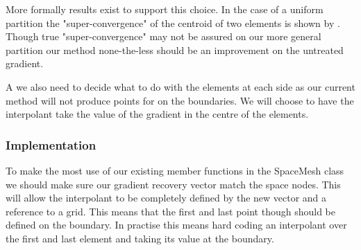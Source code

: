 \documentclass{uonmathreport}
\theoremstyle{definition}
\theoremstyle{problem}
\theoremstyle{theorem}
\begin{document}
More formally results exist to support this choice. In the case of a uniform partition the "super-convergence" of the centroid of two elements is shown by \cite{zlamal1978superconvergence}. Though true "super-convergence" may not be assured on our more general partition our method none-the-less should be an improvement on the untreated gradient. 

A we also need to decide what to do with the elements at each side as our current method will not produce points for on the boundaries. We will choose to have the interpolant take the value of the gradient in the centre of the elements.



\begin{center}
\end{center}

\subsubsection{Implementation} \label{subsubsec:KK Implementation}

To make the most use of our existing member functions in the SpaceMesh class we should make sure our gradient recovery vector match the space nodes. This will allow the interpolant to be completely defined by the new vector and a reference to a grid. This means that the first and last point though should be defined on the boundary. In practise this means hard coding an interpolant over the first and last element and taking its value at the boundary.
\end{document}
